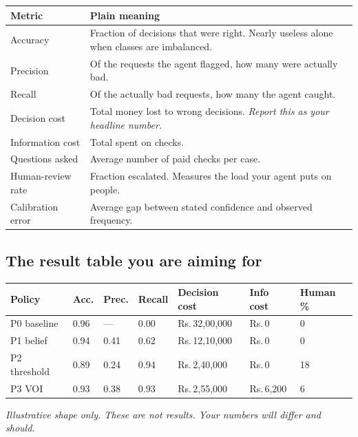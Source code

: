 \documentclass[11pt,a4paper]{article}
\newcommand{\rs}{Rs.\,}
\begin{document}
\begin{center}
\begin{tabular}{@{}L{3.6cm}L{11.0cm}@{}}
\toprule
\textbf{Metric} & \textbf{Plain meaning} \\
\midrule
Accuracy & Fraction of decisions that were right. Nearly useless alone when classes are imbalanced. \\
Precision & Of the requests the agent flagged, how many were actually bad. \\
Recall & Of the actually bad requests, how many the agent caught. \\
Decision cost & Total money lost to wrong decisions. \emph{Report this as your headline number.} \\
Information cost & Total spent on checks. \\
Questions asked & Average number of paid checks per case. \\
Human-review rate & Fraction escalated. Measures the load your agent puts on people. \\
Calibration error & Average gap between stated confidence and observed frequency. \\
\bottomrule
\end{tabular}
\end{center}

\subsection{The result table you are aiming for}

\begin{center}
\small
\begin{tabular}{@{}L{2.4cm}C{1.5cm}C{1.5cm}C{1.5cm}C{2.0cm}C{1.7cm}C{1.6cm}@{}}
\toprule
\textbf{Policy} & \textbf{Acc.} & \textbf{Prec.} & \textbf{Recall} & \textbf{Decision cost} & \textbf{Info cost} & \textbf{Human \%} \\
\midrule
P0 baseline & 0.96 & --- & 0.00 & \rs 32{,}00{,}000 & \rs 0 & 0 \\
P1 belief   & 0.94 & 0.41 & 0.62 & \rs 12{,}10{,}000 & \rs 0 & 0 \\
P2 threshold& 0.89 & 0.24 & 0.94 & \rs 2{,}40{,}000 & \rs 0 & 18 \\
P3 VOI      & 0.93 & 0.38 & 0.93 & \rs 2{,}55{,}000 & \rs 6{,}200 & 6 \\
\bottomrule
\end{tabular}
\end{center}

\emph{Illustrative shape only. These are not results. Your numbers will differ and should.}
\end{document}
